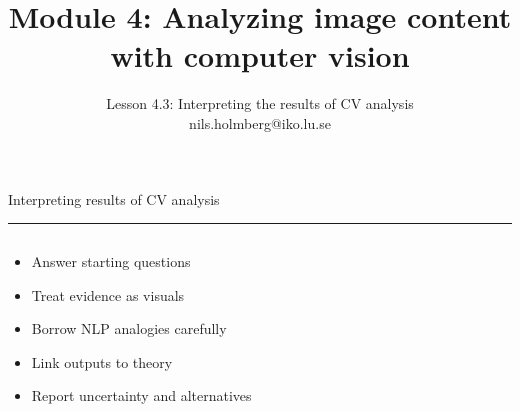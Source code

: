 \documentclass[aspectratio=169]{beamer}
\title{Module 4: Analyzing image content with computer vision}
\subtitle{Lesson 4.3: Interpreting the results of CV analysis \\[0.8em]nils.holmberg@iko.lu.se}
\author{}
\newcommand{\TitleFont}{\rmfamily}
\begin{document}
\begin{frame}[plain]
  \titlepage
\end{frame}
\setcounter{framenumber}{0} %

\begin{frame}[t]{}
  \vspace*{0.5cm}
  {\TitleFont\fontsize{18}{22}\selectfont\color{LUBronze}Interpreting results of CV analysis\par}
  \vspace{0.3em}
  {\color{LUBronze}\rule{\linewidth}{0.8pt}}\par
  \vspace{0.2cm}
  \begin{columns}[t]
    \begin{column}[t]{0.45\textwidth}
      \vspace*{0pt}
      \begin{itemize}\setlength\itemsep{0.65em}
        \item Answer starting questions
        \item Treat evidence as visuals
        \item Borrow NLP analogies carefully
        \item Link outputs to theory
        \item Report uncertainty and alternatives
      \end{itemize}
    \end{column}
  \end{columns}
\end{frame}
\end{document}
